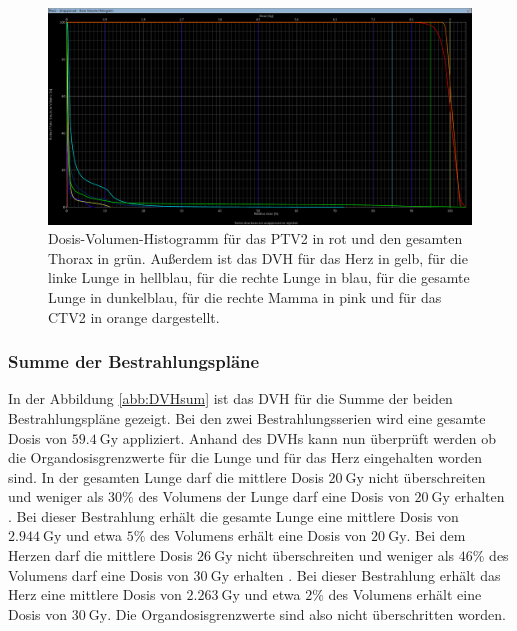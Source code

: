\begin{figure}[H]
  \centering
  \includegraphics[width=\textwidth]{Bilder/DVH2.png}
  \caption{Dosis-Volumen-Histogramm für das PTV2 in rot und den gesamten Thorax in grün. Außerdem ist das DVH für das Herz in gelb, für die linke Lunge in hellblau, für die rechte Lunge in blau, für die gesamte Lunge in dunkelblau, für die rechte Mamma in pink und für das CTV2 in orange dargestellt.}
  \label{abb:DVH2}
\end{figure}


\subsubsection*{Summe der Bestrahlungspläne}

In der Abbildung \ref{abb:DVHsum} ist das DVH für die Summe der beiden Bestrahlungspläne
gezeigt. Bei den zwei Bestrahlungsserien wird eine gesamte Dosis von $\SI{59,4}{\gray}$ appliziert.
Anhand des DVHs kann nun überprüft werden ob die Organdosisgrenzwerte für die Lunge und für
das Herz eingehalten worden sind. In der gesamten Lunge darf die mittlere Dosis $\SI{20}{\gray}$ nicht
überschreiten und weniger als $30\%$ des Volumens der Lunge darf eine Dosis von $\SI{20}{\gray}$ erhalten \cite{grenz}.
Bei dieser Bestrahlung erhält die gesamte Lunge eine mittlere Dosis von $\SI{2,944}{\gray}$ und etwa $5\%$ des Volumens
erhält eine Dosis von $\SI{20}{\gray}$. Bei dem Herzen darf die mittlere Dosis $\SI{26}{\gray}$ nicht überschreiten
und weniger als $46\%$ des Volumens darf eine Dosis von $\SI{30}{\gray}$ erhalten \cite{grenz}.
Bei dieser Bestrahlung erhält das Herz eine mittlere Dosis von $\SI{2,263}{\gray}$ und etwa $2\%$ des Volumens
erhält eine Dosis von $\SI{30}{\gray}$. Die Organdosisgrenzwerte sind also nicht überschritten worden.

